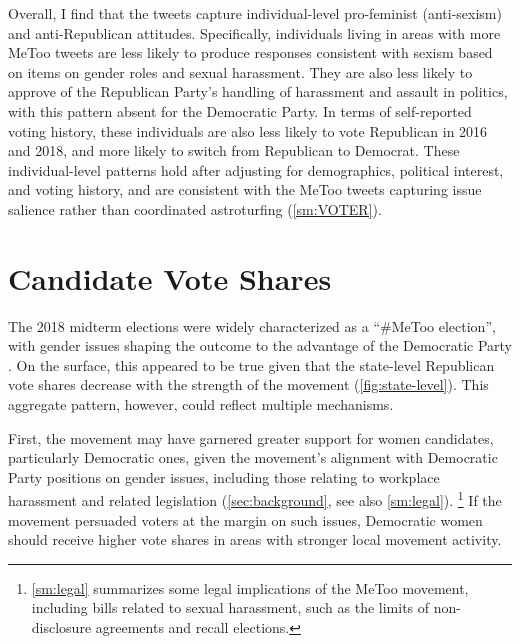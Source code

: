 \documentclass[manuscript,screen,nonacm,11pt,acm]{acmart}
\newcommand{\R}{Republican}
\begin{document}
Overall, I find that the tweets capture individual-level pro-feminist (anti-sexism) and anti-Republican attitudes.
Specifically, individuals living in areas with more MeToo tweets are less likely to produce responses consistent with sexism based on items on gender roles and sexual harassment.
They are also less likely to approve of the Republican Party's handling of harassment and assault in politics, with this pattern absent for the Democratic Party.
In terms of self-reported voting history, these individuals are also less likely to vote Republican in 2016 and 2018, and more likely to switch from Republican to Democrat.
These individual-level patterns hold after adjusting for demographics, political interest, and voting history, and are consistent with the MeToo tweets capturing issue salience \citep[e.g.,][]{sobolev2020} rather than coordinated astroturfing  (\cref{sm:VOTER}).

\section{Candidate Vote Shares}
\label{sec:voteshare}
The 2018 midterm elections were widely characterized as a ``\#MeToo election'', with gender issues shaping the outcome to the advantage of the Democratic Party \citep{genderwatch2018, telegraphMetoo, tippett2018-bi,thomsen2020, cs}.
On the surface, this appeared to be true given that the state-level \R{} vote shares decrease with the strength of the movement (\cref{fig:state-level}).
This aggregate pattern, however, could reflect multiple mechanisms.

First, the movement may have garnered greater support for women candidates, particularly Democratic ones, given the movement's alignment with Democratic Party positions on gender issues, including those relating to workplace harassment and related legislation (\cref{sec:background}, see also \cref{sm:legal}).%
\footnote{\label{fn:legal}\cref{sm:legal} summarizes some legal implications of the MeToo movement, including bills related to sexual harassment, such as the limits of non-disclosure agreements and recall elections.}
If the movement persuaded voters at the margin on such issues, Democratic women should receive higher vote shares in areas with stronger local movement activity.
\end{document}
